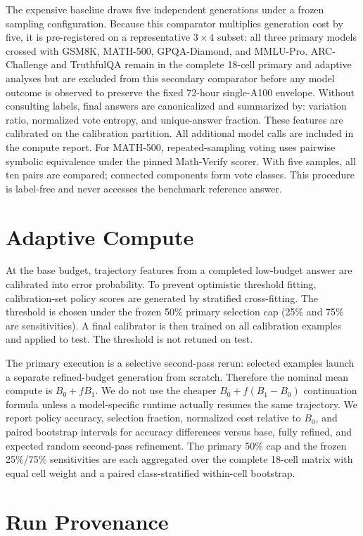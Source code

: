 The expensive baseline draws five independent generations under a frozen sampling configuration.
Because this comparator multiplies generation cost by five, it is pre-registered on a representative $3\times4$ subset: all three primary models crossed with GSM8K, MATH-500, GPQA-Diamond, and MMLU-Pro. ARC-Challenge and TruthfulQA remain in the complete 18-cell primary and adaptive analyses but are excluded from this secondary comparator before any model outcome is observed to preserve the fixed 72-hour single-A100 envelope.
Without consulting labels, final answers are canonicalized and summarized by:
variation ratio, normalized vote entropy, and unique-answer fraction.
These features are calibrated on the calibration partition.
All additional model calls are included in the compute report.
For MATH-500, repeated-sampling voting uses pairwise symbolic equivalence under the pinned Math-Verify scorer. With five samples, all ten pairs are compared; connected components form vote classes. This procedure is label-free and never accesses the benchmark reference answer.

\section{Adaptive Compute}

At the base budget, trajectory features from a completed low-budget answer are calibrated into error probability.
To prevent optimistic threshold fitting, calibration-set policy scores are generated by stratified cross-fitting.
The threshold is chosen under the frozen 50\% primary selection cap (25\% and 75\% are sensitivities).
A final calibrator is then trained on all calibration examples and applied to test.
The threshold is not retuned on test.

The primary execution is a selective second-pass rerun: selected examples launch a separate refined-budget generation from scratch. Therefore the nominal mean compute is $B_0+fB_1$. We do not use the cheaper $B_0+f(B_1-B_0)$ continuation formula unless a model-specific runtime actually resumes the same trajectory. We report policy accuracy, selection fraction, normalized cost relative to $B_0$, and paired bootstrap intervals for accuracy differences versus base, fully refined, and expected random second-pass refinement. The primary 50\% cap and the frozen 25\%/75\% sensitivities are each aggregated over the complete 18-cell matrix with equal cell weight and a paired class-stratified within-cell bootstrap.

\section{Run Provenance}

